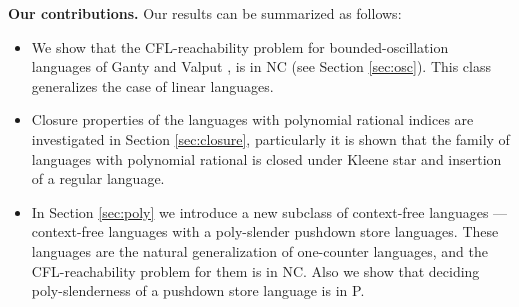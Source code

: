 \documentclass{ws-ijfcs}
\begin{document}
\textbf{Our contributions.} Our results can be summarized as follows:
\begin{itemize}
\item We show that the CFL-reachability problem for bounded-oscillation languages of Ganty and Valput \cite{BoundOsc}, is in NC (see Section \ref{sec:osc}). This class generalizes the case of linear languages. 
\item Closure properties of the languages with polynomial rational indices are investigated in Section \ref{sec:closure}, particularly it is shown that the family of languages with polynomial rational is closed under Kleene star and insertion of a regular language.
\item In Section \ref{sec:poly} we introduce a new subclass of context-free languages --- context-free languages with a poly-slender pushdown store languages. These languages are the natural generalization of one-counter languages, and the CFL-reachability problem for them is in NC. Also we show that deciding poly-slenderness of a pushdown store language is in P.
\end{itemize}






\end{document}
